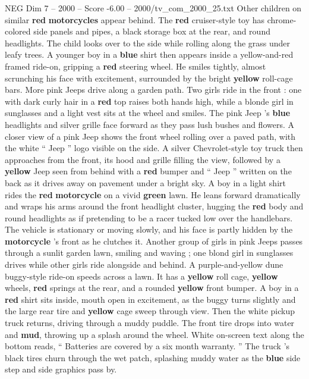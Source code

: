\begin{textsample}{NEG Dim 7 – 2000 – Score -6.00 – 2000/tv\_com\_2000\_25.txt}
Other children on similar \textbf{red} \textbf{motorcycles} appear behind.
The \textbf{red} cruiser-style toy has chrome-colored side panels and pipes, a black storage box at the rear, and round headlights.
The child looks over to the side while rolling along the grass under leafy trees.
A younger boy in a \textbf{blue} shirt then appears inside a yellow-and-red framed ride-on, gripping a \textbf{red} steering wheel.
He smiles tightly, almost scrunching his face with excitement, surrounded by the bright \textbf{yellow} roll-cage bars.
More pink Jeeps drive along a garden path.
Two girls ride in the front : one with dark curly hair in a \textbf{red} top raises both hands high, while a blonde girl in sunglasses and a light vest sits at the wheel and smiles.
The pink Jeep ’s \textbf{blue} headlights and silver grille face forward as they pass lush bushes and flowers.
A closer view of a pink Jeep shows the front wheel rolling over a paved path, with the white “ Jeep ” logo visible on the side.
A silver Chevrolet-style toy truck then approaches from the front, its hood and grille filling the view, followed by a \textbf{yellow} Jeep seen from behind with a \textbf{red} bumper and “ Jeep ” written on the back as it drives away on pavement under a bright sky.
A boy in a light shirt rides the \textbf{red} \textbf{motorcycle} on a vivid \textbf{green} lawn.
He leans forward dramatically and wraps his arms around the front headlight cluster, hugging the \textbf{red} body and round headlights as if pretending to be a racer tucked low over the handlebars.
The vehicle is stationary or moving slowly, and his face is partly hidden by the \textbf{motorcycle} ’s front as he clutches it.
Another group of girls in pink Jeeps passes through a sunlit garden lawn, smiling and waving ; one blond girl in sunglasses drives while other girls ride alongside and behind.
A purple-and-yellow dune buggy-style ride-on speeds across a lawn.
It has a \textbf{yellow} roll cage, \textbf{yellow} wheels, \textbf{red} springs at the rear, and a rounded \textbf{yellow} front bumper.
A boy in a \textbf{red} shirt sits inside, mouth open in excitement, as the buggy turns slightly and the large rear tire and \textbf{yellow} cage sweep through view.
Then the white pickup truck returns, driving through a muddy puddle.
The front tire drops into water and \textbf{mud}, throwing up a splash around the wheel.
White on-screen text along the bottom reads, “ Batteries are covered by a six month warranty. ” The truck ’s black tires churn through the wet patch, splashing muddy water as the \textbf{blue} side step and side graphics pass by.

\end{textsample}
